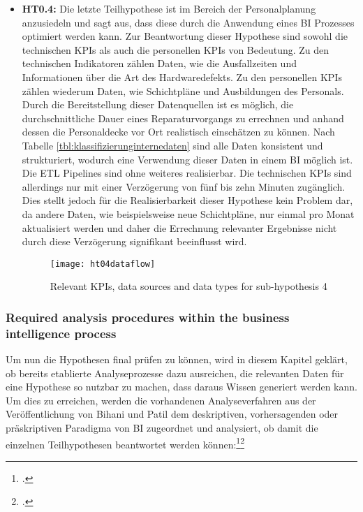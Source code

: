 \begin{itemize}
    \item \textbf{\ac{HT0.4}: }Die letzte Teilhypothese ist im Bereich der Personalplanung anzusiedeln und sagt aus, dass
    diese durch die Anwendung eines \ac{BI} Prozesses optimiert werden kann. Zur Beantwortung dieser Hypothese sind sowohl
    die technischen \acp{KPI} als auch die personellen \acp{KPI} von Bedeutung. Zu den technischen Indikatoren zählen Daten,
    wie die Ausfallzeiten und Informationen über die Art des Hardwaredefekts. Zu den personellen \acp{KPI} zählen wiederum Daten,
    wie Schichtpläne und Ausbildungen des Personals. Durch die Bereitstellung dieser Datenquellen ist es möglich, die
    durchschnittliche Dauer eines Reparaturvorgangs zu errechnen und anhand dessen die Personaldecke vor Ort realistisch
    einschätzen zu können. Nach Tabelle \ref{tbl:klassifizierunginternedaten} sind alle Daten konsistent und strukturiert,
    wodurch eine Verwendung dieser Daten in einem \ac{BI} möglich ist. Die \ac{ETL} Pipelines sind ohne weiteres realisierbar.
    Die technischen \acp{KPI} sind allerdings nur mit einer Verzögerung von fünf bis zehn Minuten zugänglich. Dies stellt jedoch
    für die Realisierbarkeit dieser Hypothese kein Problem dar, da andere Daten, wie beispielsweise neue Schichtpläne, nur einmal
    pro Monat aktualisiert werden und daher die Errechnung relevanter Ergebnisse nicht durch diese Verzögerung signifikant
    beeinflusst wird.

    \begin{figure}[H]
        \caption{Relevant KPIs, data sources and data types for sub-hypothesis 4}
        \texttt{[image: ht04dataflow]}
        \label{figure:ht04dataflow}
    \end{figure}
\end{itemize}

\subsubsection{Required analysis procedures within the business intelligence process} \label{toc:analyseverfahrenbi}

Um nun die Hypothesen final prüfen zu können, wird in diesem Kapitel geklärt, ob bereits etablierte Analyseprozesse dazu
ausreichen, die relevanten Daten für eine Hypothese so nutzbar zu machen, dass daraus Wissen generiert werden kann. Um dies
zu erreichen, werden die vorhandenen Analyseverfahren aus der Veröffentlichung von Bihani und Patil dem deskriptiven,
vorhersagenden oder präskriptiven Paradigma von \ac{BI} zugeordnet und analysiert, ob damit die einzelnen Teilhypothesen
beantwortet werden können:\footcite[Cf.][pp. 97]{bihani2014comparative}\footcite[Cf.][Fig. 2]{bihani2014comparative}

